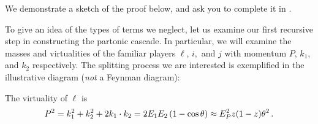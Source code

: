 We demonstrate a sketch of the proof below, and ask you to complete it in .

\begin{example}
    \label{ex:everything-on-shell}

    To give an idea of the types of terms we neglect, let us examine our first recursive step in constructing the partonic cascade.
    In particular, we will examine the masses and virtualities of the familiar players \(\ell\), \(i,\) and \(j\) with momentum \(P\), \(k_1\), and \(k_2\) respectively.
    The splitting process we are interested is exemplified in the illustrative diagram (\textit{not} a Feynman diagram):
    \begin{center}
    \end{center}
    The virtuality of \(\ell\) is
    \begin{align}
        P^2
        =
        k_1^2 + k_2^2 + 2 k_1 \cdot k_2
        =
        2 E_1 E_2 \left(1 - \cos\theta\right)
        \approx
        E_P^2 z(1-z) \theta^2
        \,.
    \end{align}



\end{example}
